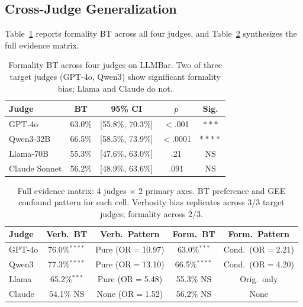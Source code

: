 \documentclass[11pt,a4paper]{article}
\begin{document}
\subsection{Cross-Judge Generalization}
\label{sec:crossjudge}

Table~\ref{tab:formality_judges} reports formality BT across all four judges, and Table~\ref{tab:evidence_matrix} synthesizes the full evidence matrix.

\begin{table}[t]
\centering
\small
\caption{Formality BT across four judges on LLMBar. Two of three target judges (GPT-4o, Qwen3) show significant formality bias; Llama and Claude do not.}
\label{tab:formality_judges}
\begin{tabular}{lcccc}
\toprule
\textbf{Judge} & \textbf{BT} & \textbf{95\% CI} & \textbf{$p$} & \textbf{Sig.} \\
\midrule
GPT-4o       & 63.0\% & [55.8\%, 70.3\%] & $<$.001  & $***$ \\
Qwen3-32B    & 66.5\% & [58.5\%, 73.9\%] & $<$.0001 & $****$ \\
Llama-70B    & 55.3\% & [47.6\%, 63.0\%] & .21      & NS \\
Claude Sonnet & 56.2\% & [48.9\%, 63.6\%] & .091     & NS \\
\bottomrule
\end{tabular}
\end{table}

\begin{table}[t]
\centering
\small
\caption{Full evidence matrix: 4 judges $\times$ 2 primary axes. BT preference and GEE confound pattern for each cell. Verbosity bias replicates across 3/3 target judges; formality across 2/3.}
\label{tab:evidence_matrix}
\begin{tabular}{lcccc}
\toprule
\textbf{Judge} & \textbf{Verb.\ BT} & \textbf{Verb.\ Pattern} & \textbf{Form.\ BT} & \textbf{Form.\ Pattern} \\
\midrule
GPT-4o  & 76.0\%$^{****}$ & Pure (OR$=$10.97) & 63.0\%$^{***}$ & Cond.\ (OR$=$2.21) \\
Qwen3   & 77.3\%$^{****}$ & Pure (OR$=$13.10) & 66.5\%$^{****}$ & Cond.\ (OR$=$4.20) \\
Llama   & 65.2\%$^{***}$  & Pure (OR$=$5.48)  & 55.3\% NS      & Orig.\ only \\
Claude  & 54.1\% NS       & None (OR$=$1.52)  & 56.2\% NS      & None \\
\bottomrule
\end{tabular}
\end{table}
\end{document}
